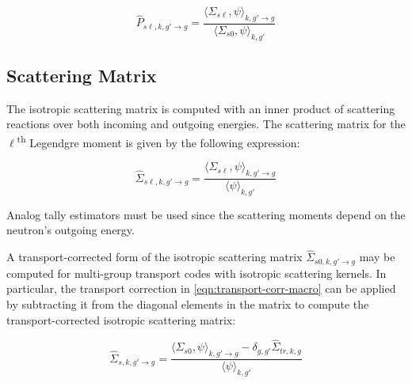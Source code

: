 \begin{equation}
\label{eqn:scatt-prob-mat}
\hat{P}_{s\ell,k,g'\rightarrow g} = \frac{{\langle \Sigma_{s\ell}, \psi \rangle}_{k,g'\rightarrow g}}{{\langle \Sigma_{s0}, \psi \rangle}_{k,g'}}
\end{equation}


\subsection{Scattering Matrix}
\label{subsubsec:tally-types-scatt-mat}

The isotropic scattering matrix is computed with an inner product of scattering reactions over both incoming and outgoing energies. The scattering matrix for the $\ell$\textsuperscript{th} Legendgre moment is given by the following expression:



\begin{equation}
\label{eqn:scatt-macro}
\hat{\Sigma}_{s\ell,k,g'\rightarrow g} = \frac{\langle \Sigma_{s\ell}, \psi \rangle_{k,g'\rightarrow g}}{\langle \psi \rangle_{k,g'}}
\end{equation}

\noindent Analog tally estimators must be used since the scattering moments depend on the neutron's outgoing energy.

A transport-corrected form of the isotropic scattering matrix $\hat{\Sigma}_{s0,k,g'\rightarrow g}$ may be computed for multi-group transport codes with isotropic scattering kernels. In particular, the transport correction in \cref{eqn:transport-corr-macro} can be applied by subtracting it from the diagonal elements in the matrix to compute the transport-corrected isotropic scattering matrix:

\begin{equation}
\label{eqn:scatt-trans-macro}
\hat{\Sigma}_{s,k,g'\rightarrow g} = \frac{\langle \Sigma_{s0}, \psi \rangle_{k,g'\rightarrow g} - \delta_{g,g'} \hat{\Sigma}_{tr,k,g}}{\langle \psi \rangle_{k,g'}}
\end{equation}

